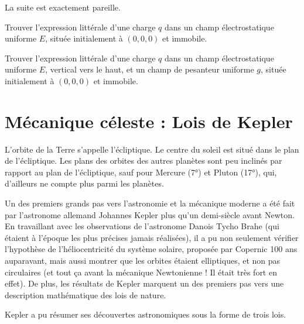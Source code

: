\documentclass[11pt,a4paper]{article}
\begin{document}
La suite est exactement pareille. 

\begin{exo}
Trouver l'expression littérale d'une charge $q$ dans un champ électrostatique uniforme $E$, située initialement à $(0,0,0)$ et immobile. 
\vspace{4.5cm}
\end{exo}

\begin{exo}
Trouver l'expression littérale d'une charge $q$ dans un champ électrostatique uniforme $E$, vertical vers le haut, et un champ de pesanteur uniforme $g$, située initialement à $(0,0,0)$ et immobile. 
\vspace{4.5cm}
\end{exo}

\section{Mécanique céleste : Lois de Kepler }

\begingroup
\setlength{\columnsep}{15pt}%
\setlength{\intextsep}{-10pt}%
\begin{table}
\begin{rmrq}
\small{L’orbite de la Terre s’appelle l’écliptique. Le centre du soleil est situé dans le plan de l’écliptique. Les plans des orbites des autres planètes sont peu inclinés par rapport au plan de l’écliptique, sauf pour Mercure (7°) et Pluton (17°), qui, d’ailleurs ne compte plus parmi les planètes. }
\end{rmrq}
\end{table}

Un des premiers grands pas vers l’astronomie et la mécanique moderne a été fait par l’astronome allemand Johannes Kepler plus qu’un demi-siècle avant Newton. En travaillant avec les observations de l’astronome Danois Tycho Brahe (qui étaient à l’époque les plus précises jamais réalisées), il a pu non seulement vérifier l’hypothèse de l’héliocentricité du système solaire, proposée par Copernic 100 ans auparavant, mais aussi montrer que les orbites étaient elliptiques, et non pas circulaires (et tout ça avant la mécanique Newtonienne ! Il était très fort en effet). De plus, les résultats de Kepler marquent un des premiers pas vers une description mathématique des lois de nature. 

Kepler a pu résumer ses découvertes astronomiques sous la forme de trois lois. 
\end{document}
